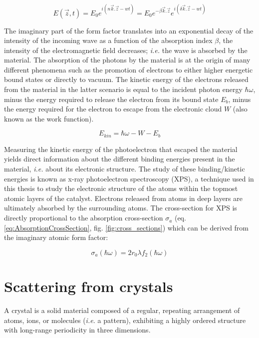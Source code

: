 \begin{equation}
    E(\vec{z}, t) = E_0 e^{i(n\vec{k}.\vec{z} - wt)} = E_0 e^{-\beta \vec{k}.\vec{z}} e^{i(\delta\vec{k}.\vec{z} - wt)}
\end{equation}

The imaginary part of the form factor translates into an exponential decay of the intensity of the incoming wave as a function of the absorption index $\beta$, the intensity of the electromagnetic field decreases; \textit{i.e.} the wave is absorbed by the material.
The absorption of the photons by the material is at the origin of many different phenomena such as the promotion of electrons to either higher energetic bound states or directly to vacuum.
The kinetic energy of the electrons released from the material in the latter scenario is equal to the incident photon energy $\hbar\omega$, minus the energy required to release the electron from its bound state $E_b$, minus the energy required for the electron to escape from the electronic cloud $W$ (also known as the work function).

\begin{equation}
    E_{kin} = \hbar\omega - W - E_b
\end{equation}

Measuring the kinetic energy of the photoelectron that escaped the material yields direct information about the different binding energies present in the material, \textit{i.e.} about its electronic structure.
The study of these binding/kinetic energies is known as x-ray photoelectron spectroscopy (XPS), a technique used in this thesis to study the electronic structure of the atoms within the topmost atomic layers of the catalyst.
Electrons released from atoms in deep layers are ultimately absorbed by the surrounding atoms.
The cross-section for XPS is directly proportional to the absorption cross-section $\sigma_a$ (eq. \ref{eq:AbsorptionCrossSection}, fig. \ref{fig:cross_sections}) which can be derived from the imaginary atomic form factor:

\begin{equation}
    \label{eq:AbsorptionCrossSection}
    \sigma_a(\hbar\omega) = 2 r_0 \lambda f_2(\hbar\omega)
\end{equation}

\section{Scattering from crystals}\label{sec:ScatCrystal}

A crystal is a solid material composed of a regular, repeating arrangement of atoms, ions, or molecules (\textit{i.e.} a pattern), exhibiting a highly ordered structure with long-range periodicity in three dimensions.


